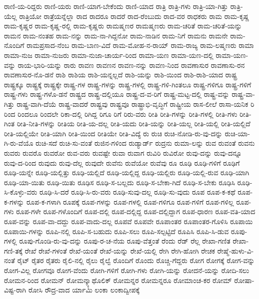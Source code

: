{ರಾಣಿ-ಯ-ರಿದ್ದರು
ರಾಣಿ-ಯರು
ರಾಣಿ-ಯಾಗ-ಬೇಕೆಂದು
ರಾಣಿ-ಯಾದ
ರಾತ್ರಿ
ರಾತ್ರಿ-ಗಳು
ರಾತ್ರಿ-ಯಾ-ಗಿತ್ತು
ರಾತ್ರಿ-ಯೆಲ್ಲ
ರಾತ್ರಿಯೋ
ರಾತ್ರೆಯನ್ನೆಲ್ಲಾ
ರಾದ
ರಾದರೂ
ರಾದರೆ
ರಾದ-ರೆಂಬುದು
ರಾದ-ವರ
ರಾಧಕರು
ರಾಮ
ರಾಮ-ಕೃಷ್ಣ
ರಾಮ-ಕೃಷ್ಣರ
ರಾಮ-ಕೃಷ್ಣ-ರಲ್ಲಿ
ರಾಮ-ಕೃಷ್ಣರು
ರಾಮಷ್ಮಣರ
ರಾಮಷ್ಮಣರು
ರಾಮ-ಚರಿತೆ
ರಾಮ-ಚರಿತೆ-ಯನ್ನು
ರಾಮನ
ರಾಮ-ನಂತಹ
ರಾಮ-ನನ್ನು
ರಾಮ-ನಾ-ಗಿದ್ದನೋ
ರಾಮ-ನಾಡಿನ
ರಾಮ-ನಿಗೆ
ರಾಮನು
ರಾಮನೇ
ರಾಮ-ನೊಂದಿಗೆ
ರಾಮಪ್ರಸಾದ-ನೆಂಬ
ರಾಮ-ಬಾಣ-ವಿದೆ
ರಾಮ-ಮೋಹ-ನ-ರಾಯ್
ರಾಮ-ರಾಜ್ಯ
ರಾಮ-ಲಷ್ಮಣರು
ರಾಮಾ
ರಾಮಾ-ನುಜ
ರಾಮಾ-ನುಜರು
ರಾಮಾ-ನುಜಾ-ಚಾರ್ಯ-ರಿಂದ
ರಾಮಾ-ಯಣ
ರಾಮಾ-ಯಣ-ದಲ್ಲಿ
ರಾಮಾ-ಯಣ-ವನ್ನು
ರಾಯ-ಭಾರಿ-ಯನ್ನು
ರಾರು
ರಾವಣ
ರಾವಣನ
ರಾವಣ-ನನ್ನು
ರಾವಣ-ನಿಂದ
ರಾವಣಾಸುರ
ರಾವಣಾಸು-ರನ
ರಾವಣಾಸುರ-ನೊ-ಡನೆ
ರಾಶಿ
ರಾಶಿಯ
ರಾಶಿ-ಯನ್ನಲ್ಲದೆ
ರಾಶಿ-ಯನ್ನು
ರಾಶಿ-ಯಿಂದ
ರಾಶಿ-ರಾಶಿ-ಯಾದ
ರಾಷ್ಟ್ರ
ರಾಷ್ಟ್ರಕ್ಕೂ
ರಾಷ್ಟ್ರಕ್ಕೆ
ರಾಷ್ಟ್ರಕ್ಕೇ
ರಾಷ್ಟ್ರ-ಗಳ
ರಾಷ್ಟ್ರ-ಗಳನ್ನು
ರಾಷ್ಟ್ರ-ಗಳಲ್ಲಿ
ರಾಷ್ಟ್ರ-ಗಳಿ-ಗಿಂತಲೂ
ರಾಷ್ಟ್ರ-ಗಳಿಗೂ
ರಾಷ್ಟ್ರ-ಗಳಿಗೆ
ರಾಷ್ಟ್ರ-ಗಳು
ರಾಷ್ಟ್ರ-ಗಳೊ-ಡನೆ
ರಾಷ್ಟ್ರದ
ರಾಷ್ಟ್ರ-ದಲ್ಲಿಯೂ
ರಾಷ್ಟ್ರ-ದ-ವ-ರಿಗೆ
ರಾಷ್ಟ್ರ-ಮಟ್ಟ-ದಲ್ಲಿ
ರಾಷ್ಟ್ರ-ವನ್ನು
ರಾಷ್ಟ್ರ-ವಾ-ಗಿತ್ತು
ರಾಷ್ಟ್ರ-ವಾಗಿ-ದೆಯೆ
ರಾಷ್ಟ್ರ-ವಾದರೆ
ರಾಷ್ಟ್ರವು
ರಾಷ್ಟ್ರವೂ
ರಾಷ್ಟ್ರಾಭಿ-ವೃದ್ಧಿಗೆ
ರಾಷ್ಟ್ರೀಯ
ರಾಸ-ಲೀಲೆ
ರಾಸಾ-ಯನಿಕ
ರಿ
ರಿಂದ
ರಿಂದಲೂ
ರಿಂದಲೇ
ರಿಕಾ-ದಲ್ಲಿ
ರಿಗಿದ್ದ
ರಿಗೂ
ರಿಗೆ
ರಿರು-ವರು
ರೀತಿ
ರೀತಿ-ಗಳನ್ನು
ರೀತಿ-ಗಳಲ್ಲಿ
ರೀತಿ-ಗಳು
ರೀತಿ-ಗಿಂತ
ರೀತಿ-ನೀತಿ-ಗಳನ್ನು
ರೀತಿಯ
ರೀತಿ-ಯ-ದಲ್ಲ
ರೀತಿ-ಯದು
ರೀತಿ-ಯನ್ನು
ರೀತಿ-ಯಲ್ಲ
ರೀತಿ-ಯಲ್ಲಿ
ರೀತಿ-ಯಲ್ಲಿದೆ
ರೀತಿ-ಯಲ್ಲಿಯೇ
ರೀತಿ-ಯಾಗಿ
ರೀತಿ-ಯಿಂದ
ರೀತಿಯೇ
ರೀತಿ-ವಿದ್ಯೆ
ರು
ರುಚಿ
ರುಚಿ-ನೋಡಿ-ರು-ವು-ದನ್ನು
ರುಚಿ-ಯಾ-ಗಿ-ರು-ವೆಯೊ
ರುಚಿ-ಸದೆ
ರುಚಿ-ಸು-ವಂತೆ
ರುಜಿನ-ಗಳಿಂದ
ರುಡ್ಯಾರ್ಡ್
ರುದ್ರನು
ರುಮಾ-ಲನ್ನು
ರುವ
ರುವಂತೆ
ರುವನು
ರುವರು
ರುವರೊ
ರುವರೋ
ರುವ-ವರು
ರುವಷ್ಟೇ
ರುವಾ
ರುವಾಗ
ರುವಿರಿ
ರುವಿರೋ
ರುವು-ದನ್ನು
ರುವು-ದನ್ನೂ
ರುವು-ದ-ರಿಂದ
ರುವುದು
ರುವು-ದೆಲ್ಲ
ರುವುದೇ
ರುವೆನು
ರುವೆಯೋ
ರುವೆವು
ರೂ
ರೂಢಿ
ರೂಢಿ-ಗಳಿಗೆ
ರೂಢಿಗೆ
ರೂಢಿ-ಯನ್ನೇ
ರೂಢಿ-ಯಲ್ಲಿತ್ತು
ರೂಢಿ-ಯಲ್ಲಿದೆ
ರೂಢಿ-ಯಲ್ಲಿದ್ದ
ರೂಢಿ-ಯಲ್ಲಿರು
ರೂಢಿ-ಯಲ್ಲಿ-ರುವ
ರೂಢಿ-ಯಾಗಿ
ರೂಢಿ-ಯಾ-ಯಿತು
ರೂಢಿ-ಯಿತು
ರೂಢಿಸ
ರೂಢಿ-ಸ-ಬಲ್ಲದು
ರೂಢಿ-ಸ-ಬೇಕಾ-ಗಿದೆ
ರೂಢಿ-ಸ-ಬೇಕು
ರೂಢಿಸಿ
ರೂಢಿ-ಸಿ-ಕೊಳ್ಳು-ವರು
ರೂಢಿ-ಸಿ-ದರೆ
ರೂಢಿ-ಸಿ-ರು-ವರು
ರೂಢಿ-ಸುವು-ದಲ್ಲ
ರೂಢಿ-ಸು-ವುದು
ರೂಪ
ರೂಪ-ಕ-ಕಥೆ
ರೂಪ-ಕ-ಗಳನ್ನು
ರೂಪ-ಕ-ಗಳಾಗಿ
ರೂಪಕ್ಕೆ
ರೂಪ-ಗಳನ್ನು
ರೂಪ-ಗಳಲ್ಲಿ
ರೂಪ-ಗಳಿಗೂ
ರೂಪ-ಗಳಿಗೆ
ರೂಪ-ಗಳಿಲ್ಲ
ರೂಪ-ಗಳು
ರೂಪ-ಗಳೇ
ರೂಪ-ಗಳೊಂದಿಗೆ
ರೂಪ-ದಲ್ಲಿ
ರೂಪ-ದಲ್ಲಿದ್ದ
ರೂಪ-ದಲ್ಲಿದ್ದಾಗ
ರೂಪ-ಧಾರಣ
ರೂಪ-ವತಿ-ಯಾದ
ರೂಪ-ವನ್ನು
ರೂಪ-ವಾ-ದದ್ದು
ರೂಪ-ವಾದು-ದಲ್ಲ
ರೂಪವೆ
ರೂಪವೇ
ರೂಪಾಂತರ
ರೂಪಾಂತರ-ಗೊಳಿಸಿ
ರೂಪಾಯಿ
ರೂಪಾಯಿ-ಗಳನ್ನು
ರೂಪಿ-ನಲ್ಲಿ
ರೂಪಿ-ಸ-ಬಹುದು
ರೂಪಿ-ಸಲು
ರೂಪಿ-ಸಲ್ಪಟ್ಟಿದೆ
ರೂಪಿಸಿ
ರೂಪಿ-ಸಿ-ಡುವ
ರೂಪು-ಗಳಲ್ಲಿ
ರೂಪು-ಗೊಂಡಿ-ರು-ವು-ದನ್ನು
ರೂಪು-ರ-ಚ-ನೆಯ
ರೂಪು-ವೆತ್ತಂತೆ
ರೆಂದು
ರೆಡ್
ರೆಲ್ಲ
ರೇಖಾ-ಗಣಿತ
ರೇಖಾ-ಗಣಿ-ತಕ್ಕೆ
ರೇಖೆ
ರೇಖೆ-ಗಳಂತೆ
ರೇಖೆ-ಯಂತೆ
ರೇಖೆ-ಯನ್ನು
ರೇಖೆ-ಯಲ್ಲಿ
ರೇಗಿ
ರೇಗಿ-ಹೋಗಿ
ರೇಚಕ
ರೇಷ್ಮೆ-ಹುಳು-ವಿ-ನಂತೆ
ರೈಟ್
ರೈತರ
ರೈತರು
ರೈಲಿ-ನಲ್ಲಿ
ರೈಲು
ರೈಲ್ವೆ
ರೊಂದಿಗೆ
ರೊಂದು
ರೊಚ್ಚಿ-ಗೆದ್ದರು
ರೋಗ
ರೋಗಕ್ಕೆ
ರೋಗ-ವನ್ನು
ರೋಗ-ವಿಲ್ಲ
ರೋಗವೂ
ರೋಗ-ವೆಂದು
ರೋಗಿ-ಗಳಿಗೆ
ರೋಗಿ-ಗಳು
ರೋಗಿ-ಯನ್ನು
ರೋದನೆ-ಯನ್ನು
ರೋದಿ-ಸಲು
ರೋಮನ-ರಿಂದ
ರೋಮನ್
ರೋಮನ್ಕ್ಯಾಥೊಲಿಕ್
ರೋಮನ್ನರ
ರೋಮನ್ನರೂ
ರೋಮಾಂಚ-ಕರ
ರೋಮ್
ರೋಷಾ-ವಿಷ್ಟ-ರಾಗಿ
ರೋಸಿ
ರೌದ್ರ-ವಾದ
ರ್ಯಾಮಿ
ಲಂಕಾ
ಲಂಕಾದ್ವೀಪಕ್ಕೆ
}
